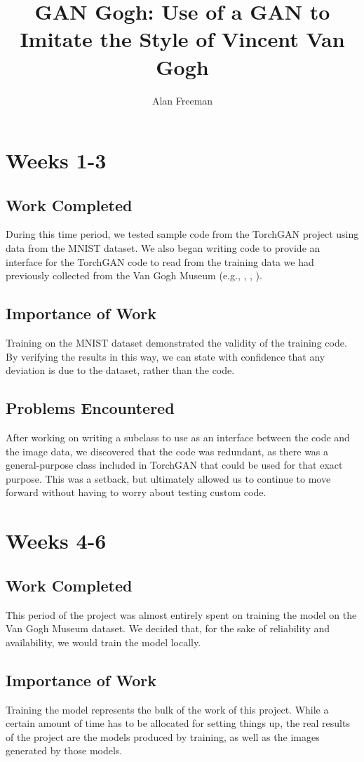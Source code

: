 \documentclass[12pt,letterpaper]{article}
\author{Alan Freeman}
\title{GAN Gogh: Use of a GAN to Imitate the Style of Vincent Van Gogh}
\begin{document}
	\maketitle
	\section{Weeks 1-3}
	\subsection{Work Completed}
	During this time period, we tested sample code from the TorchGAN\cite{pal2019torchgan} project using data from the MNIST\cite{lecun2010mnist} dataset. We also began writing code to provide an interface for the TorchGAN code to read from the training data we had previously collected from the Van Gogh Museum (e.g., \cite{001}, \cite{002}, \cite{003}).
	\subsection{Importance of Work}
	Training on the MNIST dataset demonstrated the validity of the training code. By verifying the results in this way, we can state with confidence that any deviation is due to the dataset, rather than the code.
	\subsection{Problems Encountered}
	After working on writing a subclass to use as an interface between the code and the image data, we discovered that the code was redundant, as there was a general-purpose class included in TorchGAN that could be used for that exact purpose. This was a setback, but ultimately allowed us to continue to move forward without having to worry about testing custom code.

	\section{Weeks 4-6}
	\subsection{Work Completed}
	This period of the project was almost entirely spent on training the model on the Van Gogh Museum dataset. We decided that, for the sake of reliability and availability, we would train the model locally.
	\subsection{Importance of Work}
	Training the model represents the bulk of the work of this project. While a certain amount of time has to be allocated for setting things up, the real results of the project are the models produced by training, as well as the images generated by those models.
\end{document}
